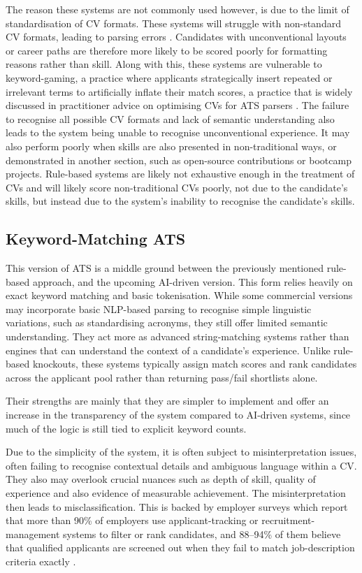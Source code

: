 The reason these systems are not commonly used however, is due to the limit of standardisation of CV formats.
These systems will struggle with non-standard CV formats, leading to parsing errors \cite{emnlp2025resumebench}.
Candidates with unconventional layouts or career paths are therefore more likely to be scored poorly for formatting 
reasons rather than skill.
Along with this, these systems are vulnerable to keyword-gaming, a practice where applicants strategically insert 
repeated or irrelevant terms to artificially inflate their match scores, a practice that is widely discussed in practitioner advice on optimising CVs for ATS parsers \cite{marr2019}.
The failure to recognise all possible CV formats and lack of semantic understanding also leads to the system being unable
to recognise unconventional experience. It may also perform poorly when skills are also presented in non-traditional ways, or
demonstrated in another section, such as open-source contributions or bootcamp projects. Rule-based systems are likely not 
exhaustive enough in the treatment of CVs and will likely score non-traditional CVs poorly, not due to the candidate's skills,
but instead due to the system's inability to recognise the candidate's skills.


\subsection{Keyword-Matching ATS}
This version of ATS is a middle ground between the previously mentioned rule-based approach, and the upcoming AI-driven version.
This form relies heavily on exact keyword matching and basic tokenisation. While some commercial versions may incorporate basic 
NLP-based parsing to recognise simple linguistic variations, such as standardising acronyms, they still offer limited
semantic understanding. They act more as advanced string-matching systems rather than engines that can understand the 
context of a candidate's experience.
Unlike rule-based knockouts, these systems typically assign match scores and rank candidates across the applicant pool rather than returning pass/fail shortlists alone.

Their strengths are mainly that they are simpler to implement and offer an increase in the transparency of the system compared 
to AI-driven systems, since much of the logic is still tied to explicit keyword counts.

Due to the simplicity of the system, it is often subject to misinterpretation issues, often failing to recognise
contextual details and ambiguous language within a CV. They also may overlook crucial nuances such as depth of skill,
quality of experience and also evidence of measurable achievement.
The misinterpretation then leads to misclassification. This is backed by employer surveys which report that more than 
90\% of employers use applicant-tracking or recruitment-management systems to filter or rank candidates, and 88--94\% 
of them believe that qualified applicants are screened out when they fail to match job-description criteria 
exactly \cite{fuller2021hiddenworkers}.

